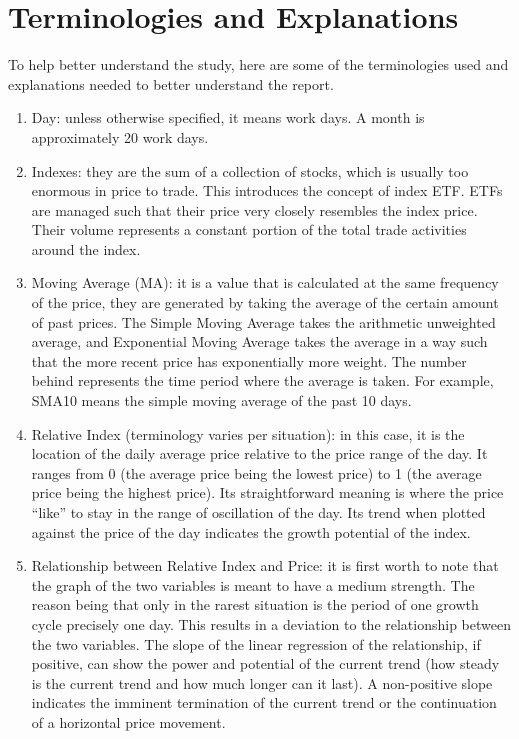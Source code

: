 \documentclass{article}
\begin{document}
 \section{Terminologies and Explanations}
 To help better understand the study, here are some of the terminologies used and explanations needed to better understand the report.
\begin{enumerate}
    \item Day: unless otherwise specified, it means work days. A month is approximately 20 work days.
\item Indexes: they are the sum of a collection of stocks, which is usually too enormous in price to trade. This introduces the concept of index ETF. ETFs are managed such that their price very closely resembles the index price. Their volume represents a constant portion of the total trade activities around the index. 
\item Moving Average (MA): it is a value that is calculated at the same frequency of the price, they are generated by taking the average of the certain amount of past prices. The Simple Moving Average takes the arithmetic unweighted average, and Exponential Moving Average takes the average in a way such that the more recent price has exponentially more weight. The number behind represents the time period where the average is taken. For example, SMA10 means the simple moving average of the past 10 days. 
\item Relative Index (terminology varies per situation): in this case, it is the location of the daily average price relative to the price range of the day. It ranges from 0 (the average price being the lowest price) to 1 (the average price being the highest price). Its straightforward meaning is where the price “like” to stay in the range of oscillation of the day. Its trend when plotted against the price of the day indicates the growth potential of the index. 
\item Relationship between Relative Index and Price: it is first worth to note that the graph of the two variables is meant to have a medium strength. The reason being that only in the rarest situation is the period of one growth cycle precisely one day. This results in a deviation to the relationship between the two variables. The slope of the linear regression of the relationship, if positive, can show the power and potential of the current trend (how steady is the current trend and how much longer can it last). A non-positive slope indicates the imminent termination of the current trend or the continuation of a horizontal price movement.  

\end{enumerate}
\end{document}
